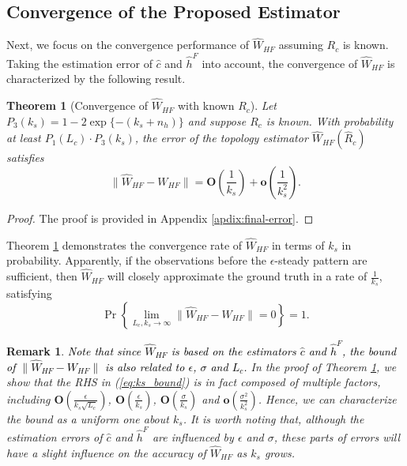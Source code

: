 \documentclass[12pt,journal,draftclsnofoot,onecolumn]{IEEEtran}
\newtheorem{remark}{Remark}
\newtheorem{theorem}{Theorem}
\let \sss=\scriptscriptstyle
\begin{document}
\subsection{Convergence of the Proposed Estimator}
Next, we focus on the convergence performance of $\hat W_{\sss HF}$ assuming $R_c$ is known. 
Taking the estimation error of $\hat c$ and $\hat h^{\sss F}$ into account, the convergence of $\hat W_{\sss HF}$ is characterized by the following result. 


\begin{theorem}[Convergence of $\hat W_{\sss HF}$ with known $R_c$]\label{th:final-error}
Let $P_3(k_s)=1-2 \exp\{-(k_s+n_h)\}$ and suppose $R_c$ is known. 
With probability at least $P_1(L_c) \cdot P_3(k_s)$, 
the error of the topology estimator $\hat W_{\sss HF}(\hat R_c)$ satisfies
\begin{equation}\label{eq:ks_bound}
 \| \hat W_{\sss HF} \!-\!  W_{\sss HF}\| = \bm{O} ( \frac{1}{k_s}) + \bm{o}( \frac{1}{k_s^2}).
\end{equation}
\end{theorem}
\begin{proof}
The proof is provided in Appendix \ref{apdix:final-error}. 
\end{proof}

Theorem \ref{th:final-error} demonstrates the convergence rate of $\hat W_{\sss HF}$ in terms of $k_s$ in probability. 
Apparently, if the observations before the $\epsilon$-steady pattern are sufficient, 
then $\hat W_{\sss HF}$ will closely approximate the ground truth in a rate of $\frac{1}{k_s}$, satisfying
\begin{equation} \label{eq:final-error}
\Pr\left\{  \mathop{\lim}\limits_{L_c,k_s\to \infty }  \| \hat W_{\sss HF} -  W_{\sss HF}\| =0 \right\}=1. 
\end{equation}
\begin{remark}
\textcolor{black}{Note that since $\hat W_{\sss HF}$ is based on the estimators $\hat c$ and $\hat h^{\sss F}$, the bound of $ \| \hat W_{\sss HF} - W_{\sss HF}\|$ is also related to $\epsilon$, $\sigma$ and $L_c$. }
In the proof of Theorem \ref{th:final-error}, we show that the RHS in (\ref{eq:ks_bound}) is in fact composed of multiple factors, including $\bm{O}( \frac{\epsilon }{k_s\sqrt{L_c}})$, $\bm{O} ( \frac{\epsilon}{k_s})$, $\bm{O} ( \frac{\sigma}{k_s})$ and $\bm{o}( \frac{\sigma^2}{k_s^2})$. 
Hence, we can characterize the bound as a uniform one about $k_s$. 
It is worth noting that, although the estimation errors of $\hat c$ and $\hat h^{\sss F}$ are influenced by $\epsilon$ and $\sigma$, these parts of errors will have a slight influence on the accuracy of $\hat W_{\sss HF}$ as $k_s$ grows. 
\end{remark}
\end{document}
